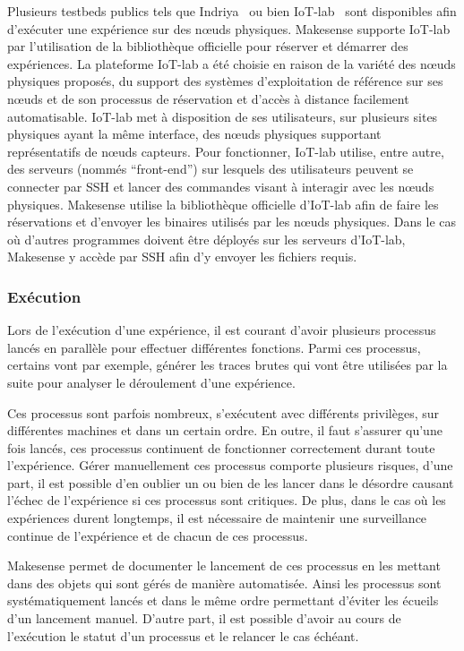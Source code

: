 Plusieurs testbeds publics tels que Indriya~\cite{doddavenkatappa2011indriya} ou bien IoT-lab~\cite{fleury2015fit} sont disponibles afin d'exécuter une expérience sur des nœuds physiques.
Makesense supporte IoT-lab par l'utilisation de la bibliothèque officielle pour réserver et démarrer des expériences.
La plateforme IoT-lab a été choisie en raison de la variété des nœuds physiques proposés, du support des systèmes d'exploitation de référence sur ses nœuds et de son processus de réservation et d'accès à distance facilement automatisable.
IoT-lab met à disposition de ses utilisateurs, sur plusieurs sites physiques ayant la même interface, des nœuds physiques supportant \ieee{} représentatifs de nœuds capteurs.
Pour fonctionner, IoT-lab utilise, entre autre, des serveurs (nommés ``front-end'') sur lesquels des utilisateurs peuvent se connecter par \ac{SSH} et lancer des commandes visant à interagir avec les nœuds physiques.
Makesense utilise la bibliothèque officielle d'IoT-lab afin de faire les réservations et d'envoyer les binaires utilisés par les nœuds physiques.
Dans le cas où d'autres programmes doivent être déployés sur les serveurs d'IoT-lab, Makesense y accède par \ac{SSH} afin d'y envoyer les fichiers requis.

\subsubsection{Exécution}

Lors de l'exécution d'une expérience, il est courant d'avoir plusieurs processus lancés en parallèle pour effectuer différentes fonctions.
Parmi ces processus, certains vont par exemple, générer les traces brutes qui vont être utilisées par la suite pour analyser le déroulement d'une expérience.

Ces processus sont parfois nombreux, s'exécutent avec différents privilèges, sur différentes machines et dans un certain ordre.
En outre, il faut s'assurer qu'une fois lancés, ces processus continuent de fonctionner correctement durant toute l'expérience.
Gérer manuellement ces processus comporte plusieurs risques, d'une part, il est possible d'en oublier un ou bien de les lancer dans le désordre causant l'échec de l'expérience si ces processus sont critiques.
De plus, dans le cas où les expériences durent longtemps, il est nécessaire de maintenir une surveillance continue de l'expérience et de chacun de ces processus.

Makesense permet de documenter le lancement de ces processus en les mettant dans des objets qui sont gérés de manière automatisée.
Ainsi les processus sont systématiquement lancés et dans le même ordre permettant d'éviter les écueils d'un lancement manuel.
D'autre part, il est possible d'avoir au cours de l'exécution le statut d'un processus et le relancer le cas échéant.

